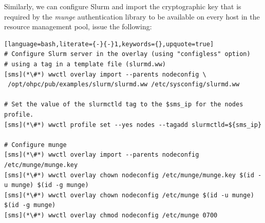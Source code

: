 \noindent Similarly, we can configure Slurm and import the cryptographic
key that is required by the {\em munge} authentication library to be available
on every host in the resource management pool, issue the following:

\begin{lstlisting}[language=bash,literate={-}{-}1,keywords={},upquote=true]
# Configure Slurm server in the overlay (using "configless" option)
# using a tag in a template file (slurmd.ww)
[sms](*\#*) wwctl overlay import --parents nodeconfig \
 /opt/ohpc/pub/examples/slurm/slurmd.ww /etc/sysconfig/slurmd.ww

# Set the value of the slurmctld tag to the $sms_ip for the nodes profile.
[sms](*\#*) wwctl profile set --yes nodes --tagadd slurmctld=${sms_ip}

# Configure munge
[sms](*\#*) wwctl overlay import --parents nodeconfig /etc/munge/munge.key
[sms](*\#*) wwctl overlay chown nodeconfig /etc/munge/munge.key $(id -u munge) $(id -g munge)
[sms](*\#*) wwctl overlay chown nodeconfig /etc/munge $(id -u munge) $(id -g munge)
[sms](*\#*) wwctl overlay chmod nodeconfig /etc/munge 0700
\end{lstlisting}
